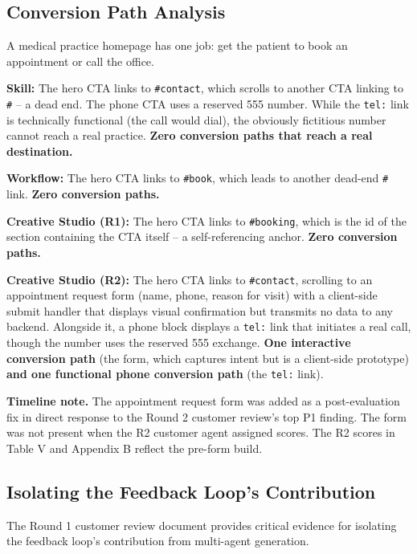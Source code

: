 \documentclass[conference]{IEEEtran}
\begin{document}
\subsection{Conversion Path Analysis}\label{conversion-path-analysis}

A medical practice homepage has one job: get the patient to book an appointment or call the office.

\textbf{Skill:} The hero CTA links to \texttt{\#contact}, which scrolls to another CTA linking to \texttt{\#} -- a dead end. The phone CTA uses a reserved 555 number. While the \texttt{tel:} link is technically functional (the call would dial), the obviously fictitious number cannot reach a real practice. \textbf{Zero conversion paths that reach a real destination.}

\textbf{Workflow:} The hero CTA links to \texttt{\#book}, which leads to another dead-end \texttt{\#} link. \textbf{Zero conversion paths.}

\textbf{Creative Studio (R1):} The hero CTA links to \texttt{\#booking}, which is the id of the section containing the CTA itself -- a self-referencing anchor. \textbf{Zero conversion paths.}

\textbf{Creative Studio (R2):} The hero CTA links to \texttt{\#contact}, scrolling to an appointment request form (name, phone, reason for visit) with a client-side submit handler that displays visual confirmation but transmits no data to any backend. Alongside it, a phone block displays a \texttt{tel:} link that initiates a real call, though the number uses the reserved 555 exchange. \textbf{One interactive conversion path} (the form, which captures intent but is a client-side prototype) \textbf{and one functional phone conversion path} (the \texttt{tel:} link).

\textbf{Timeline note.} The appointment request form was added as a post-evaluation fix in direct response to the Round 2 customer review's top P1 finding. The form was not present when the R2 customer agent assigned scores. The R2 scores in Table V and Appendix B reflect the pre-form build.

\subsection{Isolating the Feedback Loop's Contribution}\label{isolating-the-feedback-loops-contribution}

The Round 1 customer review document provides critical evidence for isolating the feedback loop's contribution from multi-agent generation.
\end{document}
